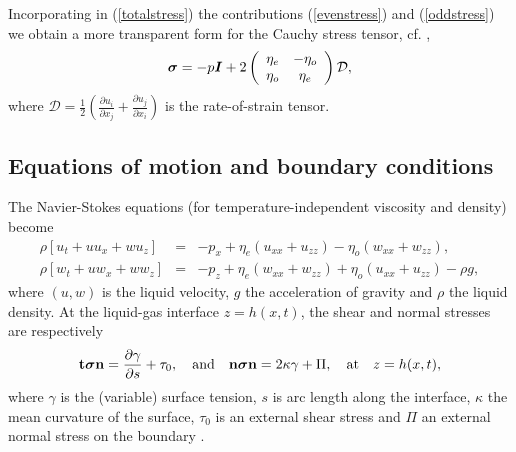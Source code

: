 \documentclass[%
 amsmath,amssymb,
 aps,
10.5pt]{revtex4-2}
\def\bm#1{\mbox{\boldmath{$#1$}}}
\def\rr#1{(\ref{#1})}
\newcommand{\be}{\begin{equation}}
\newcommand{\ee}{\end{equation}}
\begin{document}
Incorporating in \rr{totalstress} the contributions \rr{evenstress} and \rr{oddstress} we obtain a more
transparent form for the Cauchy stress tensor, cf. \cite{Kirkinis2023a}, 
\be \label{seso}
\bm{\sigma} =-p\bm{I}+
2 \left( \begin{array}{cc}
 \eta_e & -\eta_o \\
 \eta_o & \eta_e
 \end{array} \right)
\mathcal{D},
\ee
where $\mathcal{D} =  \frac{1}{2} \left(\frac{\partial u_i}{\partial x_j} + \frac{\partial u_j}{\partial x_i}\right)$ is the rate-of-strain tensor. 



\subsection{Equations of motion and boundary conditions}


{The Navier-Stokes equations (for temperature-independent viscosity and density) become}
\begin{eqnarray}  \label{nsx}
\rho\left[ u_t + uu_x +wu_z\right] & = & -p_x  + \eta_e(u_{xx} + u_{zz}) - \eta_o(w_{xx} +  w_{zz}) , \\
\rho\left[ w_t + uw_x +ww_z\right] & = & -p_z + \eta_e (w_{xx} + w_{zz}) + \eta_o(u_{xx} + 
u_{zz}) - \rho g, \label{nsy}
\end{eqnarray}
where $(u,w)$ is the liquid velocity, $g$ the acceleration of gravity and $\rho$ the liquid density. 
At the liquid-gas interface $z = h(x,t)$, the shear and normal stresses are respectively
\be  \label{freebc1}
\mathbf{t} \bm{\sigma}\mathbf{n} = \frac{\partial \gamma}{\partial s} + \tau_0, \quad \textrm{and}
\quad \mathbf{n} \bm{\sigma}\mathbf{n} = 2\kappa \gamma + \Pi,  \quad \textrm{at}\quad
z = h(x,t),
\ee
where $\gamma$ is the (variable) surface tension, $s$ is arc length along the interface, $\kappa$
the mean curvature of the surface, $\tau_0$ is an external shear stress and $\Pi$ an external normal 
stress on the boundary \cite{Oron1997}. 
\end{document}
